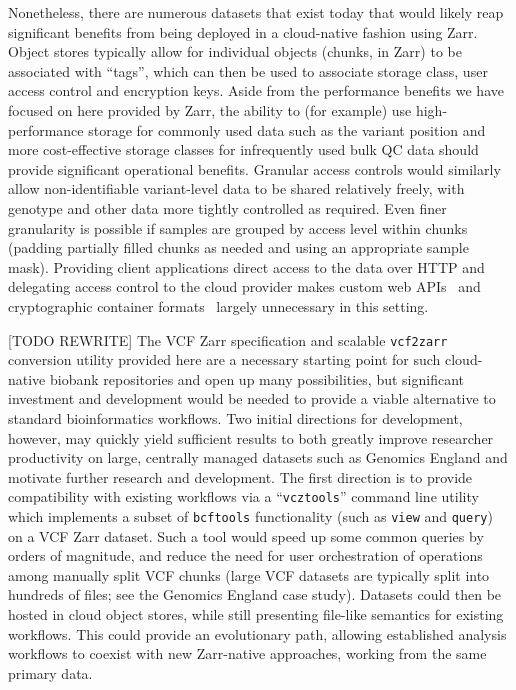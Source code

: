 \documentclass[a4paper,num-refs]{oup-contemporary}
\begin{document}
Nonetheless, there are numerous datasets that exist today
that would likely reap significant benefits from being deployed 
in a cloud-native fashion using Zarr. Object 
stores typically allow for individual objects (chunks, in
Zarr) to be associated with ``tags'', which can then be 
used to associate storage class, user access control
and encryption keys. 
Aside from the performance benefits
we have focused on here provided by Zarr, the ability
to (for example) use high-performance storage for commonly
used data such as the variant position and 
more cost-effective storage classes
for infrequently used bulk QC data should provide 
significant operational benefits.
Granular access controls would similarly allow non-identifiable
variant-level data to be shared relatively freely,
with genotype and other data more tightly controlled
as required.
Even finer granularity is possible if samples are grouped by
access level within chunks (padding partially filled 
chunks as needed and using an appropriate sample mask). 
Providing client applications direct access to 
the data over HTTP
and delegating access control to the cloud provider
makes custom web APIs~\cite{kelleher2019htsget} 
and cryptographic container formats~\citep{senf2021crypt4gh}
largely unnecessary in this setting.

[TODO REWRITE]
The VCF Zarr specification and scalable \texttt{vcf2zarr} conversion utility
provided here are a necessary starting point for such cloud-native
biobank repositories and open up many possibilities,
but significant investment and development would be needed 
to provide a viable alternative to standard bioinformatics workflows. 
Two initial directions for development, however, may quickly
yield sufficient results to both greatly improve researcher productivity on 
large, centrally managed datasets such as Genomics England
and motivate further research and development.
The first direction is to provide compatibility with existing 
workflows via a ``\texttt{vcztools}'' command line utility which 
implements a subset of \texttt{bcftools} functionality (such as 
\texttt{view} and \texttt{query}) on a VCF Zarr dataset.
Such a tool would speed up some common queries by orders 
of magnitude, and reduce the need for user orchestration of 
operations among manually split VCF chunks (large VCF datasets
are typically split into hundreds of files; see the Genomics
England case study). Datasets could then be hosted in cloud
object stores, while still presenting file-like semantics
for existing workflows. This could provide an evolutionary path,
allowing established analysis workflows to coexist with new Zarr-native
approaches, working from the same primary data.
\end{document}
